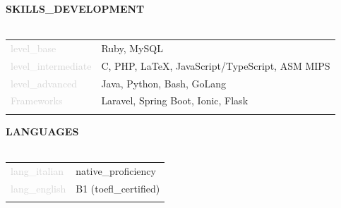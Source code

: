 \documentclass{article}
\begin{document}
\textbf{\textcolor{deepblue}{\uppercase{{{skills_development}}}}} \\\\ \hfill
\begin{tabular}{ R{4cm} L{11cm} }
	\textcolor{lightgray}{{{level_base}}} & Ruby, MySQL \\ \hfill
	\textcolor{lightgray}{{{level_intermediate}}} & C, PHP, LaTeX, JavaScript/TypeScript, ASM MIPS \\ \hfill
	\textcolor{lightgray}{{{level_advanced}}} & Java, Python, Bash, GoLang \\[.5cm] \hfill
	\textcolor{lightgray}{Frameworks} & Laravel, Spring Boot, Ionic, Flask\\ \hfill
\end{tabular}

\textbf{\textcolor{deepblue}{\uppercase{{{languages}}}}} \\\\ \hfill
\begin{tabular}{ R{4cm} L{11cm} }
	\textcolor{lightgray}{{{lang_italian}}} & {{native_proficiency}} \\ \hfill
	\textcolor{lightgray}{{{lang_english}}} & B1 ({{toefl_certified}})\\ \hfill
\end{tabular}
\end{document}
